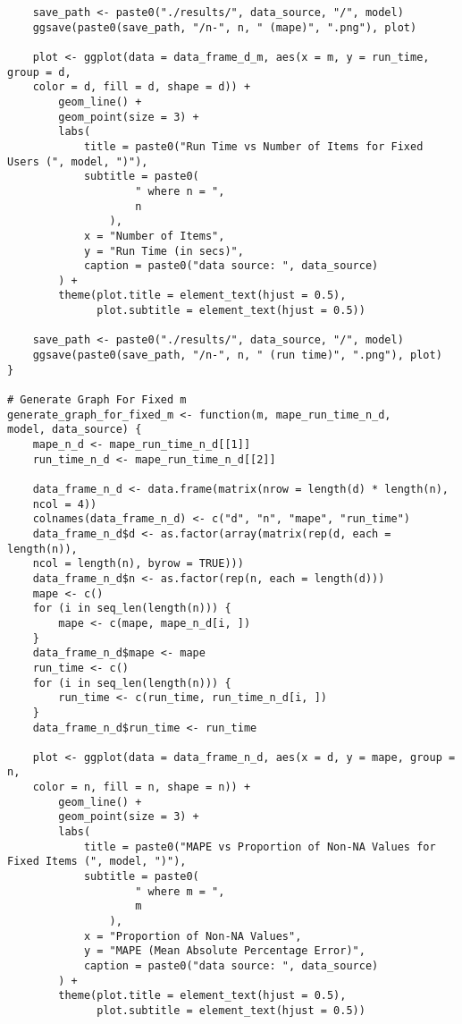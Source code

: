 \documentclass[12pt]{article}
\begin{document}
\begin{singlespace}
\begin{verbatim}
    save_path <- paste0("./results/", data_source, "/", model)
    ggsave(paste0(save_path, "/n-", n, " (mape)", ".png"), plot)

    plot <- ggplot(data = data_frame_d_m, aes(x = m, y = run_time, group = d,
    color = d, fill = d, shape = d)) +
        geom_line() +
        geom_point(size = 3) +
        labs(
            title = paste0("Run Time vs Number of Items for Fixed Users (", model, ")"),
            subtitle = paste0(
                    " where n = ",
                    n
                ),
            x = "Number of Items",
            y = "Run Time (in secs)",
            caption = paste0("data source: ", data_source)
        ) +
        theme(plot.title = element_text(hjust = 0.5),
              plot.subtitle = element_text(hjust = 0.5))

    save_path <- paste0("./results/", data_source, "/", model)
    ggsave(paste0(save_path, "/n-", n, " (run time)", ".png"), plot)
}

# Generate Graph For Fixed m
generate_graph_for_fixed_m <- function(m, mape_run_time_n_d,
model, data_source) {
    mape_n_d <- mape_run_time_n_d[[1]]
    run_time_n_d <- mape_run_time_n_d[[2]]

    data_frame_n_d <- data.frame(matrix(nrow = length(d) * length(n),
    ncol = 4))
    colnames(data_frame_n_d) <- c("d", "n", "mape", "run_time")
    data_frame_n_d$d <- as.factor(array(matrix(rep(d, each = length(n)),
    ncol = length(n), byrow = TRUE)))
    data_frame_n_d$n <- as.factor(rep(n, each = length(d)))
    mape <- c()
    for (i in seq_len(length(n))) {
        mape <- c(mape, mape_n_d[i, ])
    }
    data_frame_n_d$mape <- mape
    run_time <- c()
    for (i in seq_len(length(n))) {
        run_time <- c(run_time, run_time_n_d[i, ])
    }
    data_frame_n_d$run_time <- run_time

    plot <- ggplot(data = data_frame_n_d, aes(x = d, y = mape, group = n,
    color = n, fill = n, shape = n)) +
        geom_line() +
        geom_point(size = 3) +
        labs(
            title = paste0("MAPE vs Proportion of Non-NA Values for Fixed Items (", model, ")"),
            subtitle = paste0(
                    " where m = ",
                    m
                ),
            x = "Proportion of Non-NA Values",
            y = "MAPE (Mean Absolute Percentage Error)",
            caption = paste0("data source: ", data_source)
        ) +
        theme(plot.title = element_text(hjust = 0.5),
              plot.subtitle = element_text(hjust = 0.5))


\end{verbatim}
\end{singlespace}
\end{document}
